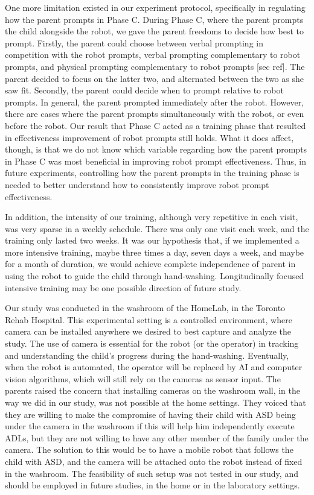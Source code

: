 One more limitation existed in our experiment protocol, specifically in regulating how the parent prompts in Phase C.  During Phase C, where the parent prompts the child alongside the robot, we gave the parent freedoms to decide how best to prompt.  Firstly, the parent could choose between verbal prompting in competition with the robot prompts, verbal prompting complementary to robot prompts, and physical prompting complementary to robot prompts [sec ref].  The parent decided to focus on the latter two, and alternated between the two as she saw fit.  Secondly, the parent could decide when to prompt relative to robot prompts.  In general, the parent prompted immediately after the robot.  However, there are cases where the parent prompts simultaneously with the robot, or even before the robot.  Our result that Phase C acted as a training phase that resulted in effectiveness improvement of robot prompts still holds.  What it does affect, though, is that we do not know which variable regarding how the parent prompts in Phase C was most beneficial in improving robot prompt effectiveness.  Thus, in future experiments, controlling how the parent prompts in the training phase is needed to better understand how to consistently improve robot prompt effectiveness.

In addition, the intensity of our training, although very repetitive in each visit, was very sparse in a weekly schedule.  There was only one visit each week, and the training only lasted two weeks.  It was our hypothesis that, if we implemented a more intensive training, maybe three times a day, seven days a week, and maybe for a month of duration, we would achieve complete independence of parent in using the robot to guide the child through hand-washing.  Longitudinally focused intensive training may be one possible direction of future study.

Our study was conducted in the washroom of the HomeLab, in the Toronto Rehab Hospital.  This experimental setting is a controlled environment, where camera can be installed anywhere we desired to best capture and analyze the study.  The use of camera is essential for the robot (or the operator) in tracking and understanding the child's progress during the hand-washing.  Eventually, when the robot is automated, the operator will be replaced by AI and computer vision algorithms, which will still rely on the cameras as sensor input.  The parents raised the concern that installing cameras on the washroom wall, in the way we did in our study, was not possible at the home settings.  They voiced that they are willing to make the compromise of having their child with ASD being under the camera in the washroom if this will help him independently execute ADLs, but they are not willing to have any other member of the family under the camera.  The solution to this would be to have a mobile robot that follows the child with ASD, and the camera will be attached onto the robot instead of fixed in the washroom.  The feasibility of such setup was not tested in our study, and should be employed in future studies, in the home or in the laboratory settings.

